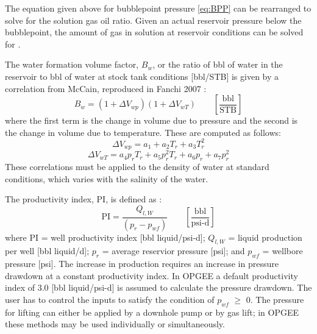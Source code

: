 \documentclass[11pt]{report}
\newcommand{\marg}[1]{{\footnotesize\textit{\textcolor{stanford}{'#1'}}}}
\newcommand{\marginnote}[1]{\marginpar{\marg{#1}}}
\newcommand{\eqnunitfrac}[2]{\quad\quad \scriptstyle{\left[\frac{\text{#1}}{\text{#2}}\right]}}
\begin{document}
The equation given above for bubblepoint pressure \ref{eq:BPP} can be rearranged to solve for the solution gas oil ratio. Given an actual reservoir pressure below the bubblepoint, the amount of gas in solution at reservoir conditions can be solved for \cite[Vol. 1, sec 6.5]{Fanchi2007}. \marginnote{Reservoir \\ M70}



The water formation volume factor, $B_w$, or the ratio of bbl of water in the reservoir to bbl of water at stock tank conditions [bbl/STB] is given by a correlation from McCain, reproduced in Fanchi 2007 \cite[p. 483]{Fanchi2007}:\marginnote{Reservoir \\ M79}
\begin{equation}
B_w = (1+\Delta V_{wp})(1+ \Delta V_{wT})  \eqnunitfrac{bbl}{STB}
\end{equation}
where the first term is the change in volume due to pressure and the second is the change in volume due to temperature. These are computed as follows:
\begin{equation}
\Delta V_{wp} = a_1+ a_2 T_r + a_3 T_r^2
\end{equation}
\begin{equation}
\Delta V_{wT} = a_4 p_r T_r+ a_5 p_r^2 T_r + a_6 p_r + a_7 p_r^2
\end{equation}
These correlations must be applied to the \marginnote{Reservoir \\ M78}density of water at standard conditions, which varies with the salinity of the water.

The productivity index, PI, is defined as \cite[p. 23]{Takacs2005}:
\begin{equation} \label{eq:pressure_drawdown}
\text{PI} = \frac{Q_{l,W}}{(p_{r}-p_{wf})} \eqnunitfrac{bbl}{psi-d}
\end{equation}
where PI = well productivity index [bbl liquid/psi-d]; $Q_{l,W}$ = liquid production per well [bbl liquid/d]; $p_{r}$ = average reservior pressure [psi]; and $p_{wf}$ = wellbore pressure [psi]. The increase in production requires an increase in pressure drawdown at a constant productivity index. In OPGEE a default productivity index of 3.0 [bbl liquid/psi-d] is assumed to calculate the pressure drawdown. The user has to control the inputs to satisfy the condition of $p_{wf}$ $\geq$ 0.
The pressure for lifting can either be applied by a downhole pump or by gas lift; in OPGEE these methods may be used individually or simultaneously. \newline
\end{document}
